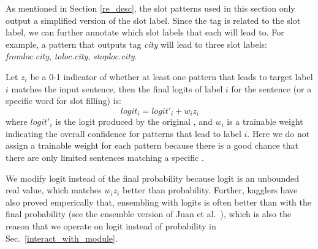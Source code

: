 As mentioned in Section \ref{re_desc}, the slot \RE patterns used in this section only output a simplified version of the slot label.
Since the \RE tag is related to the slot label, we can further annotate which slot labels that each \RE will lead to.
For example, a pattern that outputs tag \emph{city} will lead to three slot labels: \emph{fromloc.city}, \emph{toloc.city}, \emph{stoploc.city}.

Let $z_i$ be a 0-1 indicator of whether at least one \RE pattern that leads to target label $i$ matches the input sentence, then the final logits of label $i$ for the sentence (or a specific word for slot filling) is: 
\begin{equation}
logit_i = logit'_i + w_i z_i
\end{equation}
where $logit'_i$ is the logit produced by the original \NN, and $w_i$ is a trainable weight indicating the overall confidence for patterns that lead to label $i$.
Here we do not assign a trainable weight for each pattern because there is a good chance that there are only limited sentences matching a specific \RE.

We modify logit instead of the final probability because logit is an unbounded real value, which matches $w_i z_i$ better than probability. Further, kagglers have also proved emperically that, ensembling with logits is often better than with the final probability (see the ensemble version of Juan et al.~), which is also the reason that we operate on logit instead of probability in Sec.~\ref{interact_with_module}.


